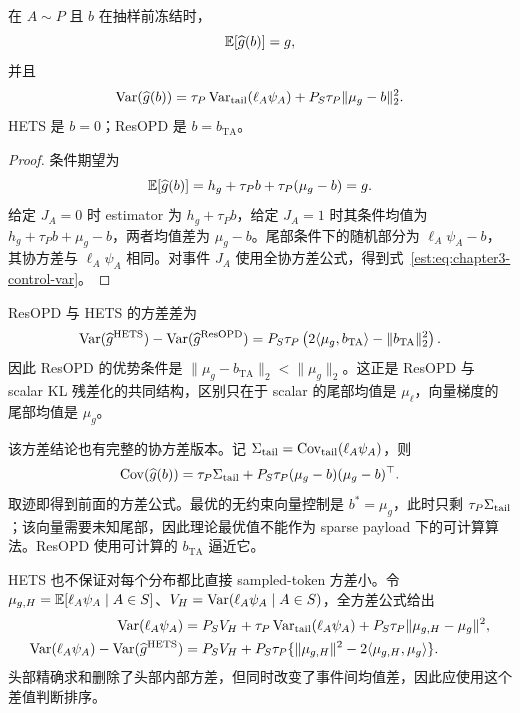 \begin{theorem}
\label{est:thm:chapter3-resopd}
在 $A\sim P$ 且 $b$ 在抽样前冻结时，
\begin{equation*}
 \mathbb E[\widehat g(b)]=g,
\end{equation*}
并且
\begin{equation}
 \operatorname{Var}(\widehat g(b))
 =\tau_P\operatorname{Var}_{\mathrm{tail}}(\ell_A\psi_A)
  +P_S\tau_P\lVert\mu_g-b\rVert_2^2.
 \label{est:eq:chapter3-control-var}
\end{equation}
HETS 是 $b=0$；ResOPD 是 $b=b_{\mathrm{TA}}$。
\end{theorem}

\begin{proof}
条件期望为
\begin{equation*}
 \mathbb E[\widehat g(b)]
 =h_g+\tau_Pb+\tau_P(\mu_g-b)=g.
\end{equation*}
给定 $J_A=0$ 时 estimator 为 $h_g+\tau_Pb$，给定 $J_A=1$ 时其条件均值为 $h_g+\tau_Pb+\mu_g-b$，两者均值差为 $\mu_g-b$。尾部条件下的随机部分为 $\ell_A\psi_A-b$，其协方差与 $\ell_A\psi_A$ 相同。对事件 $J_A$ 使用全协方差公式，得到式~\eqref{est:eq:chapter3-control-var}。
\end{proof}

ResOPD 与 HETS 的方差差为
\begin{equation}
 \operatorname{Var}(\widehat g^{\mathrm{HETS}})-\operatorname{Var}(\widehat g^{\mathrm{ResOPD}})
 =P_S\tau_P\left(2\langle\mu_g,b_{\mathrm{TA}}\rangle-\lVert b_{\mathrm{TA}}\rVert_2^2\right).
 \label{est:eq:chapter3-hets-resopd-gap}
\end{equation}
因此 ResOPD 的优势条件是
$\lVert\mu_g-b_{\mathrm{TA}}\rVert_2<\lVert\mu_g\rVert_2$。这正是 ResOPD 与 scalar KL 残差化的共同结构，区别只在于 scalar 的尾部均值是 $\mu_\ell$，向量梯度的尾部均值是 $\mu_g$。

该方差结论也有完整的协方差版本。记 $\Sigma_{\mathrm{tail}}=\operatorname{Cov}_{\mathrm{tail}}(\ell_A\psi_A)$，则
\begin{equation*}
 \operatorname{Cov}(\widehat g(b))
 =\tau_P\Sigma_{\mathrm{tail}}
  +P_S\tau_P(\mu_g-b)(\mu_g-b)^\top.
\end{equation*}
取迹即得到前面的方差公式。最优的无约束向量控制是 $b^*=\mu_g$，此时只剩 $\tau_P\Sigma_{\mathrm{tail}}$；该向量需要未知尾部，因此理论最优值不能作为 sparse payload 下的可计算算法。ResOPD 使用可计算的 $b_{\mathrm{TA}}$ 逼近它。

HETS 也不保证对每个分布都比直接 sampled-token 方差小。令 $\mu_{g,H}=\mathbb E[\ell_A\psi_A\mid A\in S]$、$V_H=\operatorname{Var}(\ell_A\psi_A\mid A\in S)$，全方差公式给出
\begin{align*}
 \operatorname{Var}(\ell_A\psi_A)&=P_SV_H+\tau_P\operatorname{Var}_{\mathrm{tail}}(\ell_A\psi_A)
 +P_S\tau_P\lVert\mu_{g,H}-\mu_g\rVert^2,\\
 \operatorname{Var}(\ell_A\psi_A)-\operatorname{Var}(\widehat g^{\mathrm{HETS}})
 &=P_SV_H+P_S\tau_P\{\lVert\mu_{g,H}\rVert^2
 -2\langle\mu_{g,H},\mu_g\rangle\}.
\end{align*}
头部精确求和删除了头部内部方差，但同时改变了事件间均值差，因此应使用这个差值判断排序。

